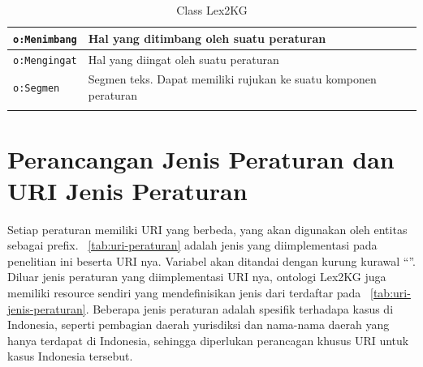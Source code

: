 \begin{longtable}[l]{|p{}|p{}|}
  \texttt{o:Menimbang}      & Hal yang ditimbang oleh suatu peraturan                                                         \\ \hline
  \texttt{o:Mengingat}      & Hal yang diingat oleh suatu peraturan                                                           \\ \hline
  \texttt{o:Segmen}         & Segmen teks. Dapat memiliki rujukan ke suatu komponen peraturan                                 \\ \hline
  \caption{Class Lex2KG}
  \label{tab:class}
\end{longtable}

\section{Perancangan Jenis Peraturan dan URI Jenis Peraturan}
\label{sec:perancangan-jenis-peraturan}

Setiap peraturan memiliki URI yang berbeda, yang akan digunakan oleh entitas sebagai prefix.
\tab~\ref{tab:uri-peraturan} adalah jenis \legal yang diimplementasi pada penelitian ini beserta URI
nya. Variabel akan ditandai dengan kurung kurawal ``\mono{\{\}}''. Diluar jenis peraturan yang
diimplementasi URI nya, ontologi Lex2KG juga memiliki resource sendiri yang mendefinisikan jenis
dari \legal terdaftar pada \tab~\ref{tab:uri-jenis-peraturan}. Beberapa jenis peraturan adalah
spesifik terhadapa kasus di Indonesia, seperti pembagian daerah yurisdiksi dan nama-nama daerah yang
hanya terdapat di Indonesia, sehingga diperlukan perancagan khusus URI untuk kasus Indonesia tersebut.

